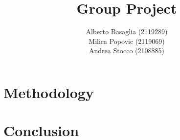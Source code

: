 \documentclass{template}
\title{Group Project}
\author{
Alberto Basaglia (2119289)\\
Milica Popovic (2119069)\\
Andrea Stocco (2108885)}
\begin{document}

\chapter{Methodology}
\chapter{Conclusion}

\cite{test}

\appendix
\end{document}
